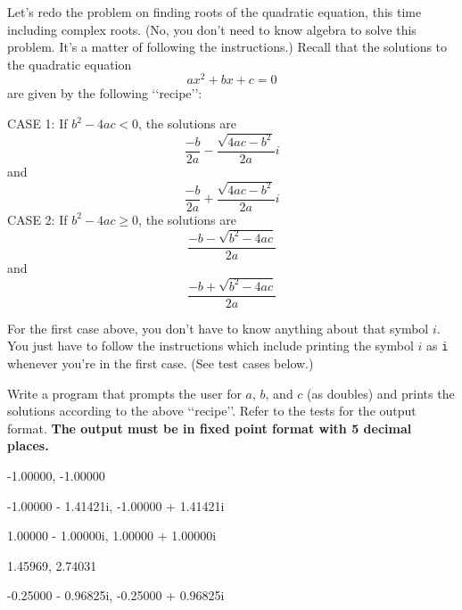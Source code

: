 Let's redo the problem on finding roots of the quadratic equation, this time 
including complex roots. (No, you don't need to know algebra to solve this 
problem. It's a matter of following the instructions.) Recall that the 
solutions to the quadratic equation
\[ax^2 + bx + c = 0\]
are given by the following \lq \lq recipe\rq \rq:
\begin{itemize}
\li CASE 1: If $b^2 - 4ac < 0$, the solutions are
\[\frac{-b}{2a} - \frac{\sqrt{4ac - b^2}}{2a} i\]
and
\[\frac{-b}{2a} + \frac{\sqrt{4ac - b^2}}{2a} i\]
\li CASE 2: If $b^2 - 4ac \geq 0$, the solutions are
\[\frac{-b - \sqrt{b^2 - 4ac}}{2a}\]
and
\[\frac{-b + \sqrt{b^2 - 4ac}}{2a}\]
\end{itemize}
For the first case above, you don't have to know anything about that
symbol $i$.
You just have to follow the instructions which include printing the symbol $i$
as \verb!i! whenever you're in the first case. (See test cases below.)

Write a program that prompts the user for $a$, $b$, and $c$ (as doubles) and 
prints the solutions according to the above \lq\lq recipe\rq\rq. Refer to the
tests for the output format.
{\bf The output must be in fixed point format with 5 decimal places.}

\resett
\nextt
\begin{console}[commandchars=\\\{\}]
-1.00000, -1.00000
\end{console}

\nextt
\begin{console}[commandchars=\\\{\}]
-1.00000 - 1.41421i, -1.00000 + 1.41421i
\end{console}

\nextt
\begin{console}[commandchars=\\\{\}]
1.00000 - 1.00000i, 1.00000 + 1.00000i
\end{console}

\nextt
\begin{console}[commandchars=\\\{\}]
1.45969, 2.74031
\end{console}

\nextt
\begin{console}[commandchars=\\\{\}]
-0.25000 - 0.96825i, -0.25000 + 0.96825i
\end{console}
